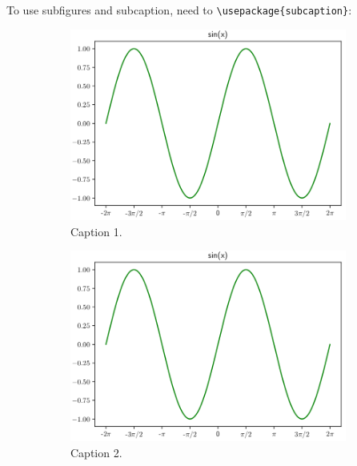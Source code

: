 \documentclass[11pt,a4paper,english,twoside,notitlepage,openright]{article}
\begin{document}
To use subfigures and subcaption, need to \verb|\usepackage{subcaption}|:
\begin{figure}[!h]
     \centering
     \begin{subfigure}[b]{0.3\textwidth}
         \centering
         \includegraphics[width=\textwidth]{figures/sin.png}
         \caption{Caption 1.}
         \label{fig:lab}
     \end{subfigure}
     \hfill
     \begin{subfigure}[b]{0.3\textwidth}
         \centering
         \includegraphics[width=\textwidth]{figures/sin.png}
         \caption{Caption 2.}
         \label{fig:lab}
     \end{subfigure}
     \hfill
     \begin{subfigure}[b]{0.3\textwidth}
         \centering

\end{subfigure}
\end{figure}
\end{document}
